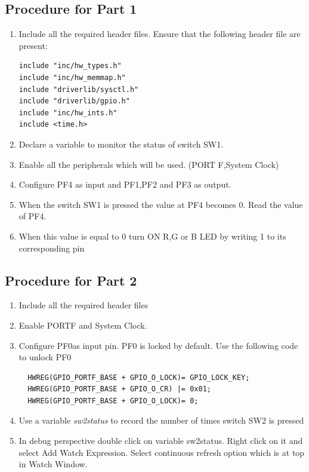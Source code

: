 \documentclass[a4paper,12pt,oneside]{book}
\begin{document}
\subsection{Procedure for Part 1}
\begin{enumerate}
\item Include all the required header files. Ensure that the following header file are present:
\begin{lstlisting}
include "inc/hw_types.h"
include "inc/hw_memmap.h"
include "driverlib/sysctl.h"
include "driverlib/gpio.h"
include "inc/hw_ints.h"
include <time.h>
\end{lstlisting}
\item Declare a variable to monitor the status of switch SW1.
\item Enable all the peripherals which will be used. (PORT F,System Clock)
\item Configure PF4 as input and PF1,PF2 and PF3 as output.
\item When the switch SW1 is pressed the value at PF4 becomes 0. Read the value of PF4.
\item When this value is equal to 0 turn ON R,G or B LED by writing 1 to its corresponding pin
\end{enumerate}
\subsection{Procedure for Part 2}
\begin{enumerate}
\item Include all the required header files
\item Enable PORTF and System Clock.
\item Configure PF0as input pin. PF0 is locked by default. Use the following code to unlock PF0
\begin{lstlisting}
  HWREG(GPIO_PORTF_BASE + GPIO_O_LOCK)= GPIO_LOCK_KEY;
  HWREG(GPIO_PORTF_BASE + GPIO_O_CR) |= 0x01;
  HWREG(GPIO_PORTF_BASE + GPIO_O_LOCK)= 0;
\end{lstlisting}
\item Use a variable \textit{sw2status} to record the number of times switch SW2 is pressed
\item In debug perspective double click on variable sw2status. Right click on it and select Add Watch Expression. Select continuous refresh option which is at top in Watch Window.
\end{enumerate} 
\end{document}
